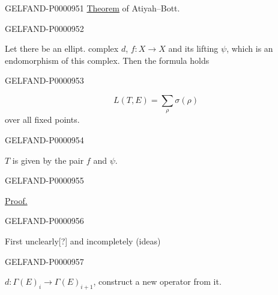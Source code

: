 \begin{GelfandAdjacentEvidence}{GELFAND-P000095}{1}
\underline{Theorem} of Atiyah–Bott.
\end{GelfandAdjacentEvidence}
\begin{GelfandAdjacentEvidence}{GELFAND-P000095}{2}

Let there be an ellipt. complex $d$,
$f:X\to X$ and its lifting $\psi$, which is an endomorphism
of this complex. Then the formula holds
\end{GelfandAdjacentEvidence}
\begin{GelfandAdjacentEvidence}{GELFAND-P000095}{3}

\begin{equation*}L(T,E)=\sum_\rho\sigma(\rho)\end{equation*}
over all fixed points.
\end{GelfandAdjacentEvidence}
\begin{GelfandAdjacentEvidence}{GELFAND-P000095}{4}

$T$ is given by the pair $f$ and $\psi$.
\end{GelfandAdjacentEvidence}
\begin{GelfandAdjacentEvidence}{GELFAND-P000095}{5}

\underline{Proof.}
\end{GelfandAdjacentEvidence}
\begin{GelfandAdjacentEvidence}{GELFAND-P000095}{6}

First unclearly[?] and incompletely (ideas)
\end{GelfandAdjacentEvidence}
\begin{GelfandAdjacentEvidence}{GELFAND-P000095}{7}

$d:\Gamma(E)_i\longrightarrow\Gamma(E)_{i+1}$, construct a new operator from it.
\end{GelfandAdjacentEvidence}
